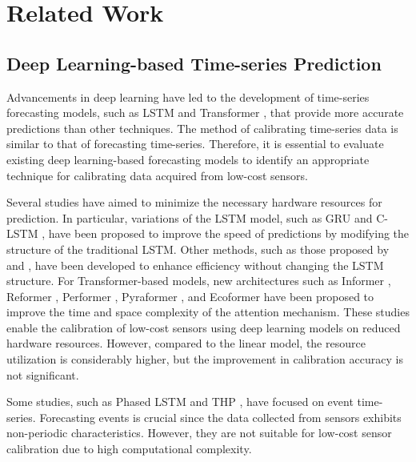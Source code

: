 \section{Related Work\label{sec_related}
}
\subsection{Deep Learning-based Time-series Prediction}
Advancements in deep learning have led to the development of time-series forecasting models, such as LSTM \cite{Hochreiter_1997} and Transformer \cite{Vaswani_2017}, that provide more accurate predictions than other techniques. The method of calibrating time-series data is similar to that of forecasting time-series. Therefore, it is essential to evaluate existing deep learning-based forecasting models to identify an appropriate technique for calibrating data acquired from low-cost sensors.


Several studies have aimed to minimize the necessary hardware resources for prediction. In particular, variations of the LSTM model, such as GRU \cite{Cho_2014} and C-LSTM \cite{Wang_2018}, have been proposed to improve the speed of predictions by modifying the structure of the traditional LSTM. Other methods, such as those proposed by \cite{Hoyer_2022} and \cite{Chen_2022}, have been developed to enhance efficiency without changing the LSTM structure. For Transformer-based models, new architectures such as Informer \cite{Zhou_2020}, Reformer \cite{Kitaev_2020}, Performer \cite{Choromanski_2021}, Pyraformer \cite{Liu_2021}, and Ecoformer \cite{Liu_2022} have been proposed to improve the time and space complexity of the attention mechanism. These studies enable the calibration of low-cost sensors using deep learning models on reduced hardware resources. However, compared to the linear model, the resource utilization is considerably higher, but the improvement in calibration accuracy is not significant.

Some studies, such as Phased LSTM \cite{Neil_2016} and THP \cite{Zuo_2020}, have focused on event time-series. Forecasting events is crucial since the data collected from sensors exhibits non-periodic characteristics. However, they are not suitable for low-cost sensor calibration due to high computational complexity.

